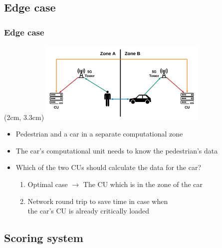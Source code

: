\documentclass{beamer}
\begin{document}
\subsection{Edge case}

\begin{frame}[t]
    \frametitle{Edge case}
    \begin{textblock*}{5cm}(2cm, 3.3cm) %
        \includegraphics[width=8cm]{pics/Edge case.png}
    \end{textblock*}
    \begin{itemize}
        \item Pedestrian and a car in a separate computational zone
        \item The car’s computational unit needs to know the pedestrian’s data
        \item Which of the two CUs should calculate the data for the car?
              \begin{enumerate}
                  \item Optimal case $\rightarrow$ The CU which is in the zone of the car
                  \item Network round trip to save time in case when \\ the car's CU is already critically loaded
              \end{enumerate}
    \end{itemize}
\end{frame}

\subsection{Scoring system}
\end{document}
